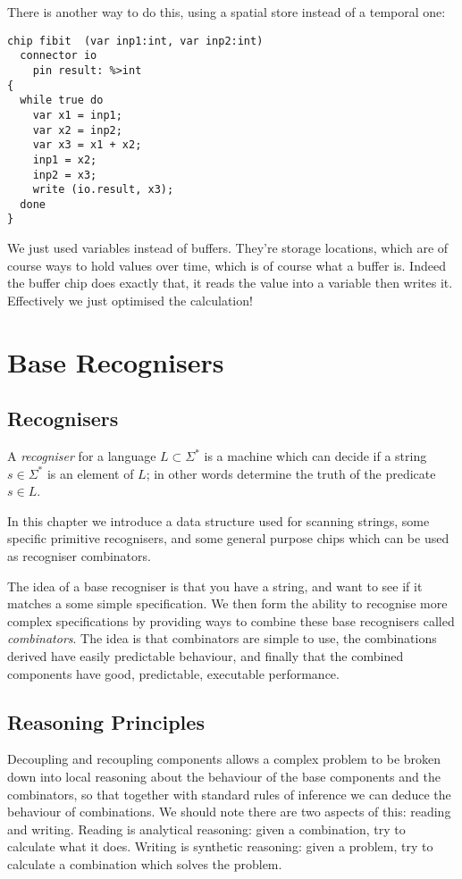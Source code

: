 \documentclass[oneside]{book}
\begin{document}
There is another way to do this, using a spatial store instead
of a temporal one:

\begin{verbatim}
chip fibit  (var inp1:int, var inp2:int)
  connector io
    pin result: %>int
{
  while true do
    var x1 = inp1;
    var x2 = inp2;
    var x3 = x1 + x2;
    inp1 = x2;
    inp2 = x3;
    write (io.result, x3);
  done
}
\end{verbatim}

We just used variables instead of buffers. They're storage locations,
which are of course ways to hold values over time, which is of course
what a buffer is. Indeed the buffer chip does exactly that,
it reads the value into a variable then writes it. Effectively
we just optimised the calculation!



\chapter{Base Recognisers}
\section{Recognisers}
A {\em recogniser} for a language $L \subset \Sigma^\ast$ is a machine
which can decide if a string $s\in \Sigma^\ast$ is an element of $L$;
in other words determine the truth of the predicate $s\in L$.

In this chapter we introduce a data structure used for scanning strings,
some specific primitive recognisers, and some general purpose chips which
can be used as recogniser combinators.

The idea of a base recogniser is that you have a string, and want to see if
it matches a some simple specification. We then form the ability to recognise
more complex specifications by providing ways to combine these base recognisers
called {\em combinators}. The idea is that combinators are simple to use,
the combinations derived have easily predictable behaviour, and finally that
the combined components have good, predictable, executable performance.

\section{Reasoning Principles}
Decoupling and recoupling components allows a complex problem to be
broken down into local reasoning about the behaviour of the base
components and the combinators, so that together with standard
rules of inference we can deduce the behaviour of combinations.
We should note there are two aspects of this: reading and writing.
Reading is analytical reasoning: given a combination, try to calculate
what it does. Writing is synthetic reasoning: given a problem, 
try to calculate a combination which solves the problem.
\end{document}
